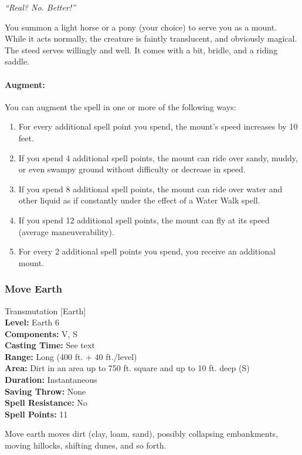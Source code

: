 \emph{``Real? No. Better!''}

You summon a light horse or a pony (your choice) to serve you as a mount. While it acts normally, the creature is faintly translucent, and obviously magical.
The steed serves willingly and well. It comes with a bit, bridle, and a riding saddle.

\paragraph{Augment:} You can augment the spell in one or more of the following ways:
\begin{enumerate}
 \item For every additional spell point you spend, the mount's speed increases by 10 feet.
 \item If you spend 4 additional spell points, the mount can ride over sandy, muddy, or even swampy ground without difficulty or decrease in speed.
 \item If you spend 8 additional spell points, the mount can ride over water and other liquid as if constantly under the effect of a 
 Water Walk spell.
 \item If you spend 12 additional spell points, the mount can fly at its speed (average maneuverability).
 \item For every 2 additional spell points you spend, you receive an additional mount.
\end{enumerate}

\subsubsection{Move Earth}
\label{Spell:MoveEarth}
Transmutation [Earth]
\\ \textbf{Level:} Earth 6
\\ \textbf{Components:} V, S
\\ \textbf{Casting Time:} See text
\\ \textbf{Range:} Long (400 ft. + 40 ft./level)
\\ \textbf{Area:} Dirt in an area up to 750 ft. square and up to 10 ft. deep (S)
\\ \textbf{Duration:} Instantaneous
\\ \textbf{Saving Throw:} None
\\ \textbf{Spell Resistance:} No
\\ \textbf{Spell Points:} 11

Move earth moves dirt (clay, loam, sand), possibly collapsing embankments, moving hillocks, shifting dunes, and so forth.

